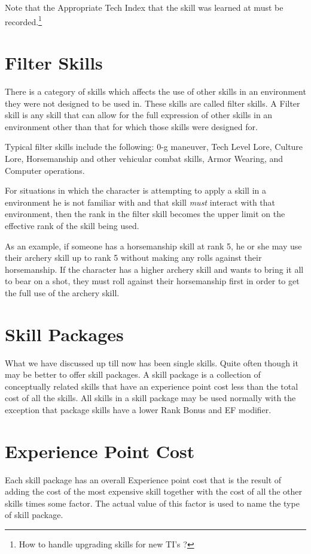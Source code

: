 Note that the Appropriate Tech Index that the skill was learned at
must be recorded.\footnote{ How to handle upgrading skills for new TI's ?}

\section{Filter Skills}

There is a category of skills which affects the use of other skills
in an environment they were not designed to be used in. These skills
are called filter skills. A Filter skill is any skill that can allow
for the full expression of other skills in an environment other than
that for which those skills were designed for.

Typical filter skills include the following: 0-g maneuver, Tech
Level Lore, Culture Lore, Horsemanship and other vehicular combat
skills, Armor Wearing, and Computer operations.

For situations in which the character is attempting to apply a skill
in a environment he is not familiar with and that skill {\em must }
interact with that environment, then the rank in the filter skill
becomes the upper limit on the effective rank of the skill being
used.

As an example, if someone has a horsemanship skill at rank 5, he or she
may use their archery skill up to rank 5 without making any rolls
against their horsemanship. If the character has a higher archery skill
and wants to bring it all to bear on a shot, they must roll against
their horsemanship first in order to get the full use of the archery
skill.

\section{Skill Packages}

What we have discussed up till now has been single skills.
Quite often though it may be better to offer skill packages.
A skill package is a collection of conceptually related
skills that have an experience point cost less than the total
cost of all the skills. All skills in a skill package may be
used normally with the exception that package skills have a lower
Rank Bonus and EF modifier.

\section{Experience Point Cost}

Each skill package has an overall Experience point cost that is
the result of adding the cost of the most expensive skill together
with the cost of all the other skills times some factor. The actual value
of this factor is used to name the type of skill package.

